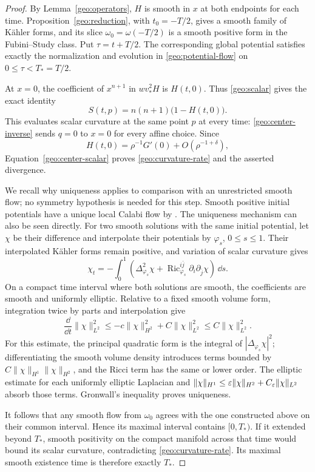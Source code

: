 \begin{proof}
By Lemma~\ref{geo:operators}, \(H\) is smooth in \(x\) at both
endpoints for each time.  Proposition~\ref{geo:reduction}, with
\(t_0=-T/2\), gives a smooth family of K\"ahler forms, and its slice
\(\omega_0=\omega(-T/2)\) is a smooth positive form in the
Fubini--Study class.  Put \(\tau=t+T/2\).  The corresponding global
potential satisfies exactly the normalization and evolution in
\eqref{geo:potential-flow} on \(0\leq\tau<T_*=T/2\).

At \(x=0\), the coefficient of \(x^{n+1}\) in
\(wv_*^2H\) is \(H(t,0)\).  Thus \eqref{geo:scalar} gives the exact
identity
\begin{equation}\label{geo:center-scalar}
 S(t,p)=n(n+1)\big(1-H(t,0)\big).
\end{equation}
This evaluates scalar curvature at the same point \(p\) at every
time: \eqref{geo:center-inverse} sends \(q=0\) to \(x=0\) for every
affine choice.  Since
\[
 H(t,0)=\rho^{-1}G'(0)+O(\rho^{-1+\delta}),
\]
Equation~\eqref{geo:center-scalar} proves
\eqref{geo:curvature-rate} and the asserted divergence.

We recall why uniqueness applies to comparison with an unrestricted
smooth flow; no symmetry hypothesis is needed for this step.  Smooth
positive initial potentials have a unique local Calabi flow by
\cite[Theorem~3.2]{ChenHe2008}.  The uniqueness mechanism can also be
seen directly.  For two smooth solutions with the same initial
potential, let \(\chi\) be their difference and interpolate their
potentials by \(\varphi_s\), \(0\leq s\leq1\).  Their interpolated
K\"ahler forms remain positive, and variation of scalar curvature
gives
\[
 \chi_t=-\int_0^1
 \left(\Delta_{\varphi_s}^2\chi
       +\operatorname{Ric}_{\varphi_s}^{i\bar j}
                            \partial_i\partial_{\bar j}\chi\right)
 \,\dd s.
\]
On a compact time interval where both solutions are smooth, the
coefficients are smooth and uniformly elliptic.  Relative to a fixed
smooth volume form, integration twice by parts and interpolation give
\[
 \frac{\dd}{\dd t}\|\chi\|_{L^2}^2
 \leq-c\|\chi\|_{H^2}^2+C\|\chi\|_{L^2}^2
 \leq C\|\chi\|_{L^2}^2.
\]
For this estimate, the principal quadratic form is the integral of
\(|\Delta_{\varphi_s}\chi|^2\); differentiating the smooth volume
density introduces terms bounded by
\(C\|\chi\|_{H^1}\|\chi\|_{H^2}\), and the Ricci term has the same
or lower order.  The elliptic estimate for each uniformly elliptic
Laplacian and
\(\|\chi\|_{H^1}\leq\varepsilon\|\chi\|_{H^2}+C_\varepsilon\|\chi\|_{L^2}\)
absorb those terms.  Gronwall's inequality proves uniqueness.

It follows that any smooth flow from \(\omega_0\) agrees with the one
constructed above on their common interval.  Hence its maximal
interval contains \([0,T_*)\).  If it extended beyond \(T_*\), smooth
positivity on the compact manifold across that time would bound its
scalar curvature, contradicting \eqref{geo:curvature-rate}.  Its
maximal smooth existence time is therefore exactly \(T_*\).
\end{proof}

